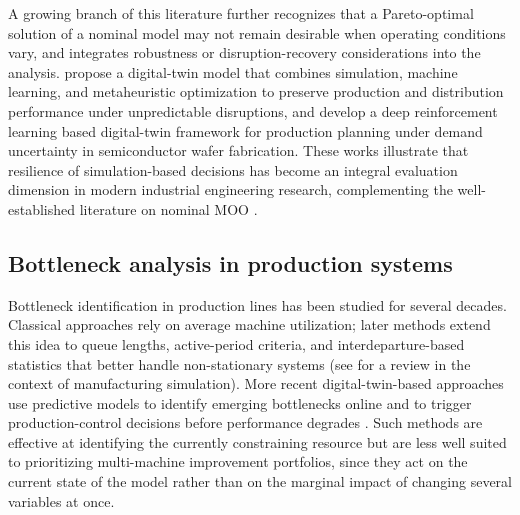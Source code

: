 \documentclass[a4paper,fleqn]{cas-sc}
\begin{document}
  A growing branch of this literature further recognizes that a Pareto-optimal solution of a nominal model may not      
  remain desirable when operating conditions vary, and integrates robustness or disruption-recovery considerations into
  the analysis. \citet{Corsini2024cie} propose a digital-twin model that combines simulation, machine learning, and
  metaheuristic optimization to preserve production and distribution performance under unpredictable disruptions, and
  \citet{Kuo2025cie} develop a deep reinforcement learning based digital-twin framework for production
  planning under demand uncertainty in semiconductor wafer fabrication. These works illustrate that resilience of    
  simulation-based decisions has become an integral evaluation dimension in modern industrial engineering research,
  complementing the well-established literature on nominal MOO \citep{Ivanov2021,Gu2015}.

\subsection{Bottleneck analysis in production systems}\label{sec:related-score}


  
  Bottleneck identification in production lines has been studied for several decades. Classical approaches rely on average machine utilization; later methods extend this idea to queue lengths, active-period criteria, and      
  interdeparture-based statistics that better handle non-stationary systems (see \citet{Bernedixen2015} for a review in the context of manufacturing simulation). More recent digital-twin-based approaches use predictive models to identify emerging bottlenecks online and to trigger production-control decisions before performance degrades \citep{Ragazzini2024cie}. Such methods are effective at identifying the currently constraining resource but are less
  well suited to prioritizing multi-machine improvement portfolios, since they act on the current state of the model rather than on the marginal impact of changing several variables at once.                                             
                                                         
\end{document}
